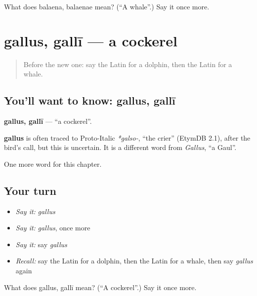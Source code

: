 \begin{tcolorbox}[breakable,colback=teal!4,colframe=teal!35!black,title={Before you move on}]
What does balaena, balaenae mean? (\textquotedblleft{}A whale\textquotedblright{}.) Say it once more.
\end{tcolorbox}
\section[gallus, gallī]{gallus, gallī — a cockerel}

\label{lesson:LA-C135-gallus}



\begin{quote}
Before the new one: say the Latin for a dolphin, then the Latin for a whale.
\end{quote}

\subsection*{You'll want to know: gallus, gallī}
\textbf{gallus, gallī} — \textquotedblleft{}a cockerel\textquotedblright{}.

\begin{cousinweb}
\textbf{gallus} is often traced to Proto-Italic \emph{*galso-}, \textquotedblleft{}the crier\textquotedblright{} (EtymDB 2.1), after the bird's call, but this is uncertain. It is a different word from \emph{Gallus}, \textquotedblleft{}a Gaul\textquotedblright{}.
\end{cousinweb}

\begin{grammarlens}[title={What you've built}]
One more word for this chapter.
\end{grammarlens}

\subsection*{Your turn}
\begin{itemize}
\raggedright
  \item \emph{Say it:} \emph{gallus}
  \item \emph{Say it:} \emph{gallus}, once more
  \item \emph{Say it:} say \emph{gallus}
  \item \emph{Recall:} say the Latin for a dolphin, then the Latin for a whale, then say \emph{gallus} again
\end{itemize}

\begin{tcolorbox}[breakable,colback=teal!4,colframe=teal!35!black,title={Before you move on}]
What does gallus, gallī mean? (\textquotedblleft{}A cockerel\textquotedblright{}.) Say it once more.
\end{tcolorbox}
